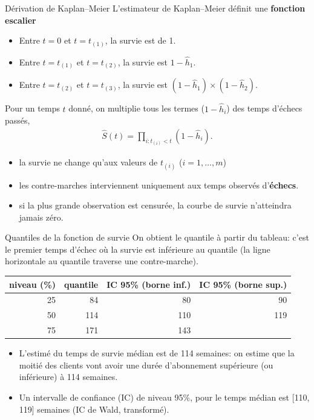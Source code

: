 \documentclass[
  ignorenonframetext,
]{beamer}
\providecommand{\tightlist}{%
  \setlength{\itemsep}{0pt}\setlength{\parskip}{0pt}}\usepackage{longtable,booktabs,array}
\begin{document}
\begin{frame}{Dérivation de Kaplan--Meier}
\protect\hypertarget{duxe9rivation-de-kaplanmeier}{}
L'estimateur de Kaplan--Meier définit une \textbf{fonction escalier}
\footnotesize

\begin{itemize}
\tightlist
\item
  Entre \(t=0\) et \(t=t_{(1)}\), la survie est de 1.
\item
  Entre \(t=t_{(1)}\) et \(t=t_{(2)}\), la survie est
  \(1-\widehat{h}_1\).
\item
  Entre \(t=t_{(2)}\) et \(t=t_{(3)}\), la survie est
  \((1-\widehat{h}_1) \times (1-\widehat{h}_2)\).
\end{itemize}

\normalsize

Pour un temps \(t\) donné, on multiplie tous les termes
(\(1-\widehat{h}_i\)) des temps d'échecs passés, \begin{align*}
 \widehat{S}(t) = \prod_{i: t_{(i)} < t} \left( 1- \widehat{h}_i\right).
\end{align*}

\begin{itemize}
\tightlist
\item
  la survie ne change qu'aux valeurs de \(t_{(i)}\) (\(i=1, \ldots, m\))
\item
  les contre-marches interviennent uniquement aux temps observés
  d'\textbf{échecs}.
\item
  si la plus grande observation est censurée, la courbe de survie
  n'atteindra jamais zéro.
\end{itemize}
\end{frame}

\begin{frame}{Quantiles de la fonction de survie}
\protect\hypertarget{quantiles-de-la-fonction-de-survie}{}
On obtient le quantile à partir du tableau: c'est le premier temps
d'échec où la survie est inférieure au quantile (la ligne horizontale au
quantile traverse une contre-marche).

\begin{table}
\centering
\begin{tabular}{rrrr}
\toprule
niveau (\%) & quantile & IC 95\% (borne inf.) & IC 95\% (borne sup.)\\
\midrule
25 & 84 & 80 & 90\\
50 & 114 & 110 & 119\\
75 & 171 & 143 & \\
\bottomrule
\end{tabular}
\end{table}

\begin{itemize}
\tightlist
\item
  L'estimé du temps de survie médian est de 114 semaines: on estime que
  la moitié des clients vont avoir une durée d'abonnement supérieure (ou
  inférieure) à 114 semaines.
\item
  Un intervalle de confiance (IC) de niveau 95\%, pour le temps médian
  est {[}110, 119{]} semaines (IC de Wald, transformé).
\end{itemize}
\end{frame}
\end{document}
